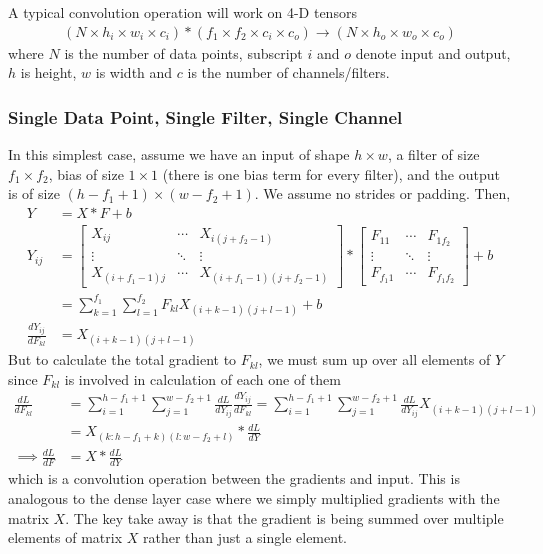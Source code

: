 \documentclass[../../deep_learning_notes.tex]{subfiles}
\begin{document}
A typical convolution operation will work on 4-D tensors
\begin{align*}
    (N \times h_{i} \times w_{i} \times c_{i}) * (f_{1} \times f_{2} \times c_{i} \times c_{o}) \rightarrow (N \times h_{o} \times w_{o} \times c_{o})
\end{align*}
where $N$ is the number of data points, subscript $i$ and $o$ denote input and output, $h$ is height, $w$ is width and $c$ is the number of channels/filters.


\subsubsection{Single Data Point, Single Filter, Single Channel}
In this simplest case, assume we have an input of shape $h \times w$, a filter of size $f_{1} \times f_{2}$, bias of size $1 \times 1$ (there is one bias term for every filter), and the output is of size $(h - f_{1} + 1) \times (w - f_{2} + 1)$. We assume no strides or padding. Then,
\begin{align*}
    Y &= X * F + b\\
    Y_{ij} &= \begin{bmatrix}
        X_{ij} &\cdots &X_{i(j + f_{2}-1)}\\
        \vdots &\ddots &\vdots\\
        X_{(i+f_{1}-1)j} &\cdots &X_{(i+f_{1}-1)(j+f_{2}-1)}
    \end{bmatrix}*
    \begin{bmatrix}
        F_{11} &\cdots &F_{1f_{2}}\\
        \vdots &\ddots &\vdots\\
        F_{f_{1}1} &\cdots &F_{f_{1}f_{2}}
    \end{bmatrix} + b\\
    &= \sum_{k=1}^{f_{1}} \sum_{l=1}^{f_{2}} F_{kl} X_{(i+k-1)(j+l-1)} + b\\
    \frac{dY_{ij}}{dF_{kl}} &= X_{(i+k-1)(j+l-1)}
\end{align*}
But to calculate the total gradient to $F_{kl}$, we must sum up over all elements of $Y$ since $F_{kl}$ is involved in calculation of each one of them
\begin{align*}
    \frac{dL}{dF_{kl}} &= \sum_{i=1}^{h - f_{1} + 1} \sum_{j=1}^{w - f_{2} + 1} \frac{dL}{dY_{ij}} \frac{dY_{ij}}{dF_{kl}}
    = \sum_{i=1}^{h - f_{1} + 1} \sum_{j=1}^{w - f_{2} + 1} \frac{dL}{dY_{ij}} X_{(i+k-1)(j+l-1)}\\
    &= X_{(k:h-f_{1}+k)(l:w-f_{2}+l)} * \frac{dL}{dY}\\
    \implies \frac{dL}{dF} &= X * \frac{dL}{dY}
\end{align*}
which is a convolution operation between the gradients and input. This is analogous to the dense layer case where we simply multiplied gradients with the matrix $X$. The key take away is that the gradient is being summed over multiple elements of matrix $X$ rather than just a single element.\newline
\end{document}
